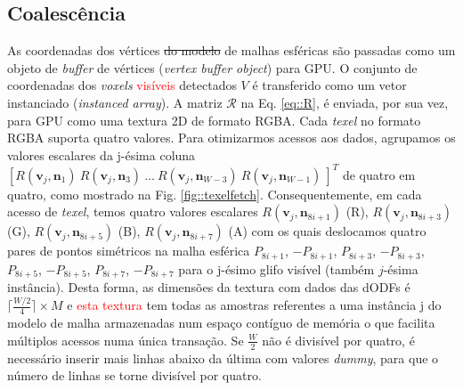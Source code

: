 \subsection{Coalescência}
\label{ssec::coalescencia}


As coordenadas dos vértices \sout{do modelo} de malhas esféricas são passadas como um objeto de \textit{buffer} de vértices (\textit{vertex buffer object}) para GPU. O conjunto de coordenadas dos \textit{voxels} \textcolor{red}{visíveis} detectados $V$ é transferido como um vetor instanciado (\textit{instanced array}). A matriz $\boldsymbol{\mathscr{R}}$ na Eq. \ref{eq::R}, é enviada, por sua vez, para GPU como uma textura 2D de formato RGBA. Cada \textit{texel} no formato RGBA suporta quatro valores. Para otimizarmos acessos aos dados, agrupamos os valores escalares da j-ésima coluna $[
R(\mathbf{v}_{j}, \mathbf{n}_1) ~
R(\mathbf{v}_{j}, \mathbf{n}_3) ~ ... ~
R(\mathbf{v}_{j}, \mathbf{n}_{W-3}) ~
R(\mathbf{v}_{j}, \mathbf{n}_{W-1}) ~
]^T$ de quatro em quatro, como mostrado na Fig. \ref{fig::texelfetch}. Consequentemente, em cada acesso de \textit{texel}, temos quatro valores escalares $
R(\mathbf{v}_{j}, \mathbf{\mathbf{n}}_{8i+1})$ (R), $
R(\mathbf{v}_{j}, \mathbf{\mathbf{n}}_{8i+3})$ (G), $
R(\mathbf{v}_{j}, \mathbf{\mathbf{n}}_{8i+5})$ (B), $
R(\mathbf{v}_{j}, \mathbf{\mathbf{n}}_{8i+7})$ (A) com os quais deslocamos quatro pares de pontos simétricos na malha esférica $P_{8i+1}$, $-P_{8i+1}$, $P_{8i+3}$, $-P_{8i+3}$, $P_{8i+5}$, $-P_{8i+5}$, $P_{8i+7}$, $-P_{8i+7}$ para o j-ésimo glifo visível (também $j$-ésima instância). Desta forma, as dimensões da textura com dados das dODFs é $ \lceil \frac{W/2}{4} \rceil \times M$ e \textcolor{red}{esta textura} tem todas as amostras referentes a uma instância j do modelo de malha armazenadas num espaço contíguo de memória o que facilita múltiplos acessos numa única transação. Se $\frac{W}{2}$ não é divisível por quatro, é necessário inserir mais linhas abaixo da última com valores \textit{dummy}, para que o número de linhas se torne divisível por quatro.

